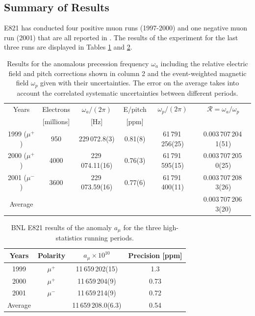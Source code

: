 \documentclass{outhesis}
\begin{document}
\subsection{Summary of Results}

E821 has conducted four positive muon runs (1997-2000) and one negative muon run (2001) that are all reported in \cite{bnl}. The results of the experiment for the last three runs are displayed in Tables \ref{tab:R} and \ref{tab:amu}.
\begin{table}
  \caption{Results for the anomalous precession frequency $\omega_a$ including the relative electric field and pitch corrections shown in column 2 and the event-weighted magnetic field $\omega_p$ given with their uncertainties. The error on the average takes into account the correlated systematic uncertainties between different periods.}
  \label{tab:R}
  \centering
  \begin{tabular}{*{6}{c}}
	\hline \hline
      Years  & Electrons & $\omega_a/(2\pi)$& E/pitch & $\omega_p/(2\pi)$ & $\mathcal{R} = \omega_a/\omega_p$\\ 
      &[millions] &  [Hz]  &  [ppm]  & & \\
      \hline
       1999 ($\mu^+$) & 950 & 229\,072.8(3) & 0.81(8) & 61\,791\,256(25)& 0.003\,707\,204\,1(51)  \\
       2000 ($\mu^+$) & 4000 & 229\,074.11(16) & 0.76(3) & 61\,791\,595(15)& 0.003\,707\,205\,0(25)  \\
       2001 ($\mu^-$)  & 3600 & 229\,073.59(16) & 0.77(6) & 61\,791\,400(11)& 0.003\,707\,208\,3(26)  \\  \hline
       Average & & & & & 0.003\,707\,206\,3(20) \\
         \hline  \hline
     \end{tabular}
\end{table}
\begin{table}
  \caption{BNL E821 results of the anomaly $a_{\mu}$ for the three high-statistics running periods. }
  \label{tab:amu}
  \centering
  \begin{tabular}{*{4}{c}}
	\hline \hline
      Years  & Polarity & $a_{\mu}\times 10^{10}$ & Precision [ppm] \\ \hline
       1999 & $\mu^+$ & 11\,659\,202(15) & 1.3  \\
       2000 & $\mu^+$ & 11\,659\,204(9) & 0.73  \\
       2001 & $\mu^-$ & 11\,659\,214(9) & 0.72  \\ \hline
       Average & & 11\,659\,208.0(6.3) & 0.54\\
         \hline  \hline
     \end{tabular}
\end{table}
\end{document}
